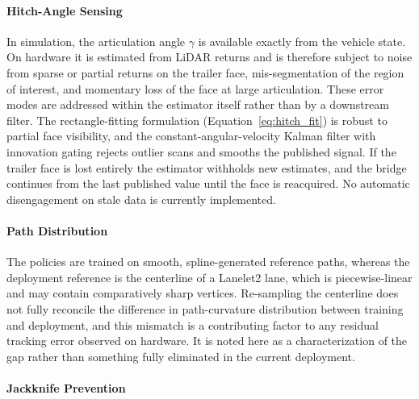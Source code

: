 \paragraph{Hitch-Angle Sensing}
\label{sec:gap_hitch}

In simulation, the articulation angle $\gamma$ is available exactly from the vehicle state. On hardware it is estimated from LiDAR returns and is therefore subject to noise from sparse or partial returns on the trailer face, mis-segmentation of the region of interest, and momentary loss of the face at large articulation. These error modes are addressed within the estimator itself rather than by a downstream filter. The rectangle-fitting formulation (Equation~\ref{eq:hitch_fit}) is robust to partial face visibility, and the constant-angular-velocity Kalman filter with innovation gating rejects outlier scans and smooths the published signal. If the trailer face is lost entirely the estimator withholds new estimates, and the bridge continues from the last published value until the face is reacquired. No automatic disengagement on stale data is currently implemented.

\paragraph{Path Distribution}

The policies are trained on smooth, spline-generated reference paths, whereas the deployment reference is the centerline of a Lanelet2 lane, which is piecewise-linear and may contain comparatively sharp vertices. Re-sampling the centerline does not fully reconcile the difference in path-curvature distribution between training and deployment, and this mismatch is a contributing factor to any residual tracking error observed on hardware. It is noted here as a characterization of the gap rather than something fully eliminated in the current deployment.

\paragraph{Jackknife Prevention}

